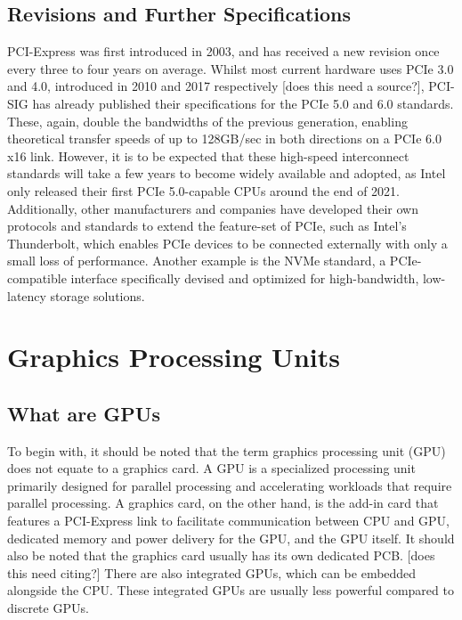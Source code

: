 \subsection{Revisions and Further Specifications}

PCI-Express was first introduced in 2003, and has received a new revision once every three to four years on average. Whilst most current hardware uses PCIe 3.0 and 4.0, introduced in 2010 and 2017 respectively [does this need a source?], PCI-SIG has already published their specifications for the PCIe 5.0 and 6.0 standards. These, again, double the bandwidths of the previous generation, enabling theoretical transfer speeds of up to 128GB/sec in both directions on a PCIe 6.0 x16 link.\cite{sharma_pci_2020} However, it is to be expected that these high-speed interconnect standards will take a few years to become widely available and adopted, as Intel only released their first PCIe 5.0-capable CPUs around the end of 2021. \cite{intel_product_nodate} Additionally, other manufacturers and companies have developed their own protocols and standards to extend the feature-set of PCIe, such as Intel's Thunderbolt, which enables PCIe devices to be connected externally with only a small loss of performance. \cite{intel_what_nodate} Another example is the NVMe standard, a PCIe-compatible interface specifically devised and optimized for high-bandwidth, low-latency storage solutions. \cite{kingston_understanding_nodate}


\section{Graphics Processing Units}


\subsection{What are GPUs}
To begin with, it should be noted that the term graphics processing unit (GPU) does not equate to a graphics card. A GPU is a specialized processing unit primarily designed for parallel processing and accelerating workloads that require parallel processing. \cite{intel_what_nodate} A graphics card, on the other hand, is the add-in card that features a PCI-Express link to facilitate communication between CPU and GPU, dedicated memory and power delivery for the GPU, and the GPU itself. It should also be noted that the graphics card usually has its own dedicated PCB. [does this need citing?] There are also integrated GPUs, which can be embedded alongside the CPU.  These integrated GPUs are usually less powerful compared to discrete GPUs. \cite{intel_what_nodate}

